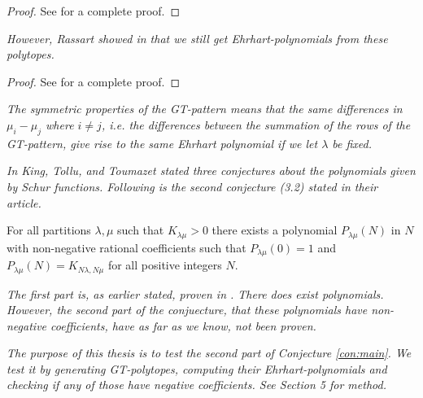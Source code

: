 		
		\begin{proof} 
			See \cite{DeLoeraMcAllister2004} for a complete proof. 
		\end{proof}
		
		\emph{
		However, Rassart showed in \cite{Rassart2004} that we still get Ehrhart-polynomials from these polytopes. 
		}
		
		
		\begin{proof}
			See \cite{Rassart2004} for a complete proof.
		\end{proof}
		
		\emph{
		The symmetric properties of the GT-pattern means that the same differences in $\mu_i - \mu_j$ where $i \neq j$, 
		i.e. the differences between the summation of the rows of the GT-pattern,  
		give rise to the same Ehrhart polynomial if we let $\lambda$ be fixed. }
		
		\bigskip
		
		\emph{
		In \cite{KingTolluToumazet2004} King, Tollu, and Toumazet stated three conjectures about 
		the polynomials given by Schur functions. Following is the second conjecture (3.2) stated in their article. 
		}
		
		\begin{conjecture} \label{con:main}
			For all partitions $\lambda,\mu$ such that $K_{\lambda \mu} > 0$  there exists a polynomial $P_{\lambda \mu}(N)$ 
			in $N$ with non-negative rational coefficients such that $P_{\lambda \mu}(0) = 1$ and 
			$P_{\lambda \mu}(N) = K_{N \lambda, N \mu}$ for all positive integers $N$. 
		\end{conjecture}
		
		\emph{
		The first part is, as earlier stated, proven in \cite{Rassart2004}. There does exist polynomials. 
		However, the second part of the conjuecture, that these polynomials have non-negative coefficients, 
		have as far as we know, not been proven. }
		
		\emph{
		The purpose of this thesis is to test the second part of Conjecture \ref{con:main}. 
		We test it by generating GT-polytopes, computing their Ehrhart-polynomials and checking if any of those have 
		negative coefficients. See Section 5 for method.}